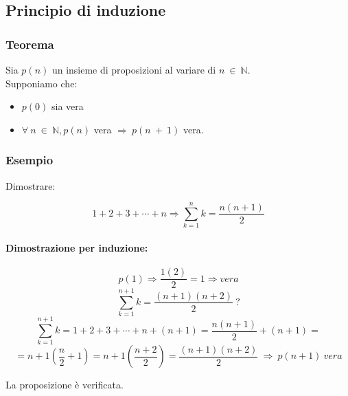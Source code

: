 \subsection{Principio di induzione}
        \subsubsection*{Teorema}
            Sia $p(n)$ un insieme di proposizioni al variare di $n\ \in\ \mathbb{N}$.\\
            Supponiamo che:\\
            \begin{Large}
                \begin{itemize}
                    \item $p(0)$ sia vera
                    \item $\forall\ n\ \in\ \mathbb{N}, p(n)$ vera $\Rightarrow\ p(n\ +\ 1)$ vera. 
                \end{itemize}
            \end{Large}
        \subsubsection*{Esempio}
        Dimostrare:
        \begin{Large}
            \[1+2+3+\cdots+n \Rightarrow \sum_{k=1}^{n}k = \frac{n(n+1)}{2}\] 
        \end{Large}
        \begin{Large}
            \paragraph{Dimostrazione per induzione: \\}
            \begin{equation}
                p(1) \Rightarrow \frac{1(2)}{2} = 1 \Rightarrow vera
            \end{equation}
            \begin{equation}
                    \sum_{k=1}^{n+1}k = \frac{(n+1)(n+2)}{2}\ ?
            \end{equation}
            \begin{equation*}
                \sum_{k=1}^{n+1}k = 1+2+3+\cdots+n+(n+1) = \frac{n(n+1)}{2}+(n+1)=
            \end{equation*}
            \begin{equation*}
                =n+1(\frac{n}{2}+1)=n+1(\frac{n+2}{2})=\frac{(n+1)(n+2)}{2}\ \Rightarrow\ p(n+1)\ vera
            \end{equation*}
            \hfill \break
        \end{Large}
            La proposizione è verificata.
\
